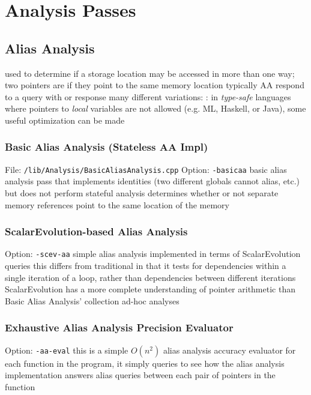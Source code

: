 \documentclass{myproc}
\begin{document}
\section{Analysis Passes}
\subsection{Alias Analysis}
\bit
\w used to determine if a storage location may be accessed in more than one
way; two pointers are  if they point to the same memory location 
\w typically AA respond to a query with  or  response
\w many different variations:
  \bit
  \w {}:
     in {\em type-safe\/} languages where pointers to {\em local\/} variables
     are not allowed (e.g. ML, Haskell, or Java), some useful optimization can be
     made 
   \w {}
   \w {}
   \w {}
   \w {}
   \eit
\eit
\subsubsection{Basic Alias Analysis (Stateless AA Impl)}
\bit
\w File: \verb+/lib/Analysis/BasicAliasAnalysis.cpp+
\w Option: \verb+-basicaa+
\w basic alias analysis pass that implements identities (two different globals
cannot alias, etc.) but does not perform stateful analysis
\w determines whether or not separate memory references point to the same
location of the memory 
\eit

\subsubsection{ScalarEvolution-based Alias Analysis}
\bit
\w Option: \verb+-scev-aa+
\w simple alias analysis implemented in terms of ScalarEvolution queries
\w this differs from traditional  in that it
tests for dependencies within a single iteration of a loop, rather than
dependencies between different iterations
\w ScalarEvolution has a more complete understanding of pointer arithmetic
than Basic Alias Analysis' collection ad-hoc analyses
\eit

\subsubsection{Exhaustive Alias Analysis Precision Evaluator}
\bit
\w Option: \verb+-aa-eval+
\w this is a simple $O(n^2)$ alias analysis accuracy evaluator
\w for each function in the program, it simply queries to see how the alias
analysis implementation answers alias queries between each pair of pointers in
the function 
\eit
\end{document}
